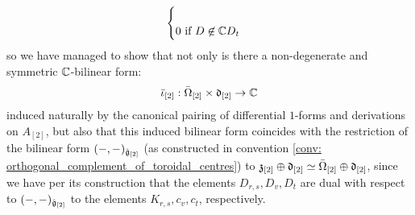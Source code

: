 \begin{remark}
$$\begin{cases}
                        \\
                        \text{$0$ if $D \not \in \mathbb{C} D_t$}
                    \end{cases}
                $$
            so we have managed to show that not only is there a non-degenerate and symmetric $\mathbb{C}$-bilinear form:
                $$\bar{\iota}_{[2]}: \bar{\Omega}_{[2]} \x \d_{[2]} \to \bbC$$
            induced naturally by the canonical pairing of differential $1$-forms and derivations on $A_{[2]}$, but also that this induced bilinear form coincides with the restriction of the bilinear form $(-, -)_{\hat{\mathfrak{g}}_{[2]}}$ (as constructed in convention \ref{conv: orthogonal_complement_of_toroidal_centres}) to $\mathfrak{z}_{[2]} \oplus \mathfrak{d}_{[2]} \simeq \bar{\Omega}_{[2]} \oplus \mathfrak{d}_{[2]}$, since we have per its construction that the elements $D_{r, s}, D_v, D_t$ are dual with respect to $(-, -)_{\hat{\mathfrak{g}}_{[2]}}$ to the elements $K_{r, s}, c_v, c_t$, respectively. 
        \end{remark}

